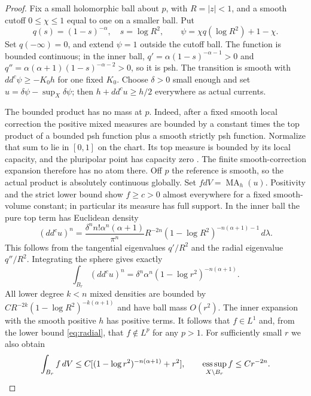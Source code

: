 \documentclass[11pt]{article}
\newcommand{\ddc}{dd^c}
\newcommand{\MA}{\operatorname{MA}}
\theoremstyle{remark}\newtheorem{remark}[theorem]{Remark}
\begin{document}
\begin{proof}
Fix a small holomorphic ball about $p$, with $R=|z|<1$, and a smooth
cutoff $0\leq\chi\leq1$ equal to one on a smaller ball. Put
\[
 q(s)=(1-s)^{-\alpha},\quad s=\log R^2,
 \qquad \psi=\chi q(\log R^2)+1-\chi.
\]
Set $q(-\infty)=0$, and extend $\psi=1$ outside the cutoff ball.
The function is bounded continuous; in the inner ball,
$q'=\alpha(1-s)^{-\alpha-1}>0$ and
$q''=\alpha(\alpha+1)(1-s)^{-\alpha-2}>0$, so it is psh.
The transition is smooth with $\ddc\psi\geq-K_0h$ for one fixed
$K_0$. Choose $\delta>0$ small enough and set
$u=\delta\psi-\sup_X\delta\psi$; then
$h+\ddc u\geq h/2$ everywhere as actual currents.

The bounded product has no mass at $p$. Indeed, after a fixed smooth
local correction the positive mixed measures are bounded by a constant
times the top product of a bounded psh function plus a smooth strictly
psh function. Normalize that sum to lie in $[0,1]$ on the chart. Its
top measure is bounded by its local capacity, and the pluripolar point
has capacity zero \cite[Theorem 6.9 and the capacity definition]{BT}.
The finite smooth-correction expansion therefore has no atom there.
Off $p$ the reference is smooth, so the
actual product is absolutely continuous globally. Set $fdV=\MA_h(u)$.
Positivity and the strict lower bound show $f\geq c>0$ almost everywhere
for a fixed smooth-volume constant; in particular its measure has full
support. In the inner ball the pure top term has Euclidean density
\begin{equation}\label{eq:radial}
 (\ddc u)^n=
 \frac{\delta^n n!\alpha^n(\alpha+1)}{\pi^n}
 R^{-2n}(1-\log R^2)^{-n(\alpha+1)-1}\,d\lambda.
\end{equation}
This follows from the tangential eigenvalues $q'/R^2$ and the radial
eigenvalue $q''/R^2$. Integrating the sphere gives exactly
\[
 \int_{B_r}(\ddc u)^n
     =\delta^n\alpha^n(1-\log r^2)^{-n(\alpha+1)}.
\]
All lower degree $k<n$ mixed densities are bounded by
$C R^{-2k}(1-\log R^2)^{-k(\alpha+1)}$ and have ball mass $O(r^2)$.
The inner expansion with the smooth positive $h$ has positive terms.
It follows that $f\in L^1$ and, from the lower bound
\eqref{eq:radial}, that $f\notin L^p$ for any $p>1$.
For sufficiently small $r$ we also obtain
\begin{equation}\label{eq:ball}
 \int_{B_r}f\,dV\leq C[(1-\log r^2)^{-n(\alpha+1)}+r^2],
 \qquad \mathop{\rm ess\,sup}_{X\setminus B_r}f\leq C r^{-2n}.
\end{equation}


\end{proof}
\end{document}
